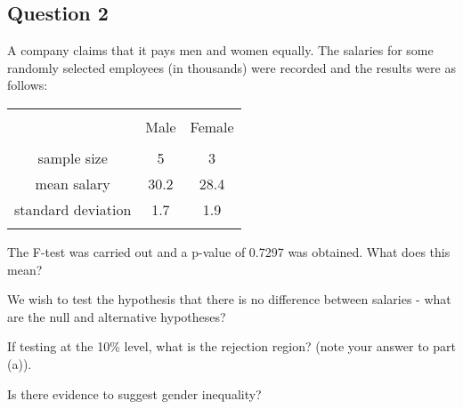 
\subsection*{Question 2}
A company claims that it pays men and women equally. The salaries for some randomly selected employees (in thousands) were recorded and the results were as follows:\\
\begin{center}
\begin{tabular}{|c|c|c|}
\hline
&&\\[-0.4cm]
& Male & Female \\
\hline
&&\\[-0.4cm]
sample size & 5 & 3 \\
mean salary & 30.2 & 28.4 \\
standard deviation & 1.7 & 1.9 \\
\hline
\multicolumn{3}{c}{}\\[-0.3cm]
\end{tabular}
\end{center}

\item The F-test was carried out and a p-value of 0.7297 was obtained. What does this mean? 

 \item We wish to test the hypothesis that there is no difference between salaries - what are the null and alternative hypotheses? 
 \item If testing at the 10\% level, what is the rejection region? (note your answer to part (a)). 
 \item Is there evidence to suggest gender inequality?


